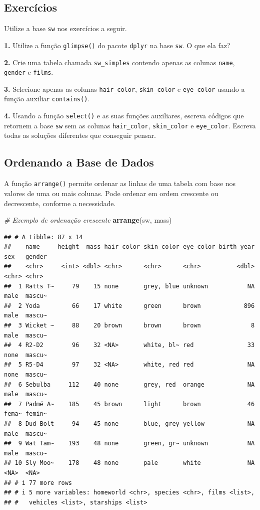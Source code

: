 \documentclass[
]{book}
\newenvironment{Shaded}{\begin{snugshade}}{\end{snugshade}}
\newcommand{\CommentTok}[1]{\textcolor[rgb]{0.56,0.35,0.01}{\textit{#1}}}
\newcommand{\FunctionTok}[1]{\textcolor[rgb]{0.13,0.29,0.53}{\textbf{#1}}}
\newcommand{\NormalTok}[1]{#1}
\begin{document}
\subsection{Exercícios}\label{exercuxedcios-15}

Utilize a base \texttt{sw} nos exercícios a seguir.

\textbf{1.} Utilize a função \texttt{glimpse()} do pacote \texttt{dplyr} na base \texttt{sw}. O
que ela faz?

\textbf{2.} Crie uma tabela chamada \texttt{sw\_simples} contendo apenas as colunas
\texttt{name}, \texttt{gender} e \texttt{films}.

\textbf{3.} Selecione apenas as colunas \texttt{hair\_color}, \texttt{skin\_color} e
\texttt{eye\_color} usando a função auxiliar \texttt{contains()}.

\textbf{4.} Usando a função \texttt{select()} e as suas funções auxiliares, escreva
códigos que retornem a base \texttt{sw} sem as colunas \texttt{hair\_color},
\texttt{skin\_color} e \texttt{eye\_color}. Escreva todas as soluções diferentes que
conseguir pensar.

\subsection{Ordenando a Base de Dados}\label{ordenando-a-base-de-dados}

A função \texttt{arrange()} permite ordenar as linhas de uma tabela com base
nos valores de uma ou mais colunas. Pode ordenar em ordem crescente ou
decrescente, conforme a necessidade.

\begin{Shaded}
\begin{Highlighting}[]
\CommentTok{\# Exemplo de ordenação crescente}
\FunctionTok{arrange}\NormalTok{(sw, mass)}
\end{Highlighting}
\end{Shaded}

\begin{verbatim}
## # A tibble: 87 x 14
##    name     height  mass hair_color skin_color eye_color birth_year sex   gender
##    <chr>     <int> <dbl> <chr>      <chr>      <chr>          <dbl> <chr> <chr> 
##  1 Ratts T~     79    15 none       grey, blue unknown           NA male  mascu~
##  2 Yoda         66    17 white      green      brown            896 male  mascu~
##  3 Wicket ~     88    20 brown      brown      brown              8 male  mascu~
##  4 R2-D2        96    32 <NA>       white, bl~ red               33 none  mascu~
##  5 R5-D4        97    32 <NA>       white, red red               NA none  mascu~
##  6 Sebulba     112    40 none       grey, red  orange            NA male  mascu~
##  7 Padmé A~    185    45 brown      light      brown             46 fema~ femin~
##  8 Dud Bolt     94    45 none       blue, grey yellow            NA male  mascu~
##  9 Wat Tam~    193    48 none       green, gr~ unknown           NA male  mascu~
## 10 Sly Moo~    178    48 none       pale       white             NA <NA>  <NA>  
## # i 77 more rows
## # i 5 more variables: homeworld <chr>, species <chr>, films <list>,
## #   vehicles <list>, starships <list>
\end{verbatim}
\end{document}
